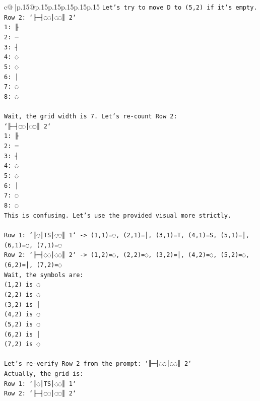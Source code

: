 \documentclass{article}
\begin{document}
{\begin{supertabular}{c@{$\;$}|p{.15\linewidth}@{}p{.15\linewidth}p{.15\linewidth}p{.15\linewidth}p{.15\linewidth}p{.15\linewidth}}
{{{\texttt{Let's try to move D to (5,2) if it's empty.} \\
\texttt{Row 2: `╟─┤◌◌│◌◌║ 2`} \\
\texttt{1: ╟} \\
\texttt{2: ─} \\
\texttt{3: ┤} \\
\texttt{4: ◌} \\
\texttt{5: ◌} \\
\texttt{6: │} \\
\texttt{7: ◌} \\
\texttt{8: ◌} \\
\\ 
\texttt{Wait, the grid width is 7. Let's re{-}count Row 2:} \\
\texttt{`╟─┤◌◌│◌◌║ 2`} \\
\texttt{1: ╟} \\
\texttt{2: ─} \\
\texttt{3: ┤} \\
\texttt{4: ◌} \\
\texttt{5: ◌} \\
\texttt{6: │} \\
\texttt{7: ◌} \\
\texttt{8: ◌} \\
\texttt{This is confusing. Let's use the provided visual more strictly.} \\
\\ 
\texttt{Row 1: `║◌│TS│◌◌║ 1` {-}> (1,1)=◌, (2,1)=│, (3,1)=T, (4,1)=S, (5,1)=│, (6,1)=◌, (7,1)=◌} \\
\texttt{Row 2: `╟─┤◌◌│◌◌║ 2` {-}> (1,2)=◌, (2,2)=◌, (3,2)=│, (4,2)=◌, (5,2)=◌, (6,2)=│, (7,2)=◌} \\
\texttt{Wait, the symbols are:} \\
\texttt{(1,2) is ◌} \\
\texttt{(2,2) is ◌} \\
\texttt{(3,2) is │} \\
\texttt{(4,2) is ◌} \\
\texttt{(5,2) is ◌} \\
\texttt{(6,2) is │} \\
\texttt{(7,2) is ◌} \\
\\ 
\texttt{Let's re{-}verify Row 2 from the prompt: `╟─┤◌◌│◌◌║ 2`} \\
\texttt{Actually, the grid is:} \\
\texttt{Row 1: `║◌│TS│◌◌║ 1`} \\
\texttt{Row 2: `╟─┤◌◌│◌◌║ 2`} \\
}}}
\end{supertabular}}
\end{document}
